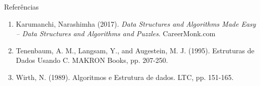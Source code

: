 \begin{frame}{Referências}
	\begin{enumerate}
	\item Karumanchi, Narashimha (2017). 
	\textit{Data Structures and Algorithms Made Easy -- Data Structures and Algorithms
		and Puzzles}.  CareerMonk.com

\item Tenenbaum, A. M., Langsam, Y., and Augestein, M. J. (1995). Estruturas de Dados Usando C. MAKRON Books, pp. 207-250.
\item Wirth, N. (1989). Algoritmos e Estrutura de dados. LTC, pp. 151-165.
	\end{enumerate}
\end{frame}
